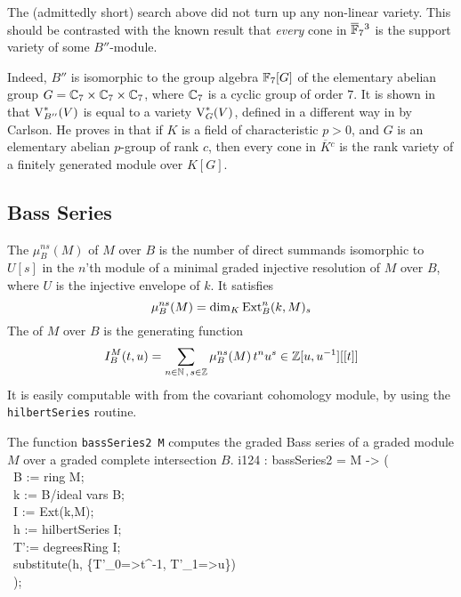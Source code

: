 \begin{sRemark}
\label{letdown}
The (admittedly short) search above did not turn up any non-linear
variety.  This should be contrasted with the known result that
{\it every\/} cone in ${\overline {{\mathbb F}}_7}{}^3$ is the support variety of
some $B''$-module.

Indeed, $B''$ is isomorphic to the group algebra ${\mathbb F}_7[G]$ of the
elementary abelian group $G={\mathbb C}_7\times{\mathbb C}_7\times{\mathbb C}_7$, where ${\mathbb C}_7$ is
a cyclic group of order $7$.  It is shown in
\cite[Sect.~7]{CI:MR90g:13027} that $\operatorname{V}^*_{B''}(V)$ is equal to a
variety $\operatorname{V}^*_G(V)$, defined in a different way in
\cite{CI:MR85a:20004} by Carlson.  He proves in \cite{CI:MR86b:20009}
that if $K$ is a field of characteristic $p>0$, and $G$ is an
elementary abelian $p$-group of rank $c$, then every cone in
${\overline K}{}^c$ is the rank variety of a finitely generated module
over $K[G]$.
 \end{sRemark}

\subsection{Bass Series}
\label{Bass series}

The {\it{}\/} $\mu^{ns}_B(M)$ of $M$ over $B$ is
the number of direct summands isomorphic to $U[s]$ in the $n$'th module
of a minimal graded injective resolution of $M$ over $B$, where $U$ 
is the injective envelope of $k$.  It satisfies
\[
\mu^{ns}_B(M)=\dim_K\operatorname{Ext}^n_B(k,M)_{s}
\]
The {\it{}\/} of $M$ over $B$ is the generating
function
\[
{I}^M_B(t,u)=\sum_{n\in{\mathbb N}\,,\,s\in{\mathbb Z}}\mu^{ns}_B(M)\, t^nu^s
\in{\mathbb Z}[u,u^{-1}][[t]]
\]
It is easily computable with \Mtwo from the covariant cohomology module,
by using the {\tt hilbertSeries} routine.

\begin{sCode}
The function {\tt bassSeries2 M} computes the graded Bass series of a
graded module $M$ over a graded complete intersection $B$.
\beginOutput
i124 : bassSeries2 = M -> (\\
\          B := ring M;\\
\          k := B/ideal vars B;\\
\          I := Ext(k,M);\\
\          h := hilbertSeries I;\\
\          T':= degreesRing I;\\
\          substitute(h, \{T'_0=>t^-1, T'_1=>u\})\\
\          );\\
\endOutput
 \end{sCode}

